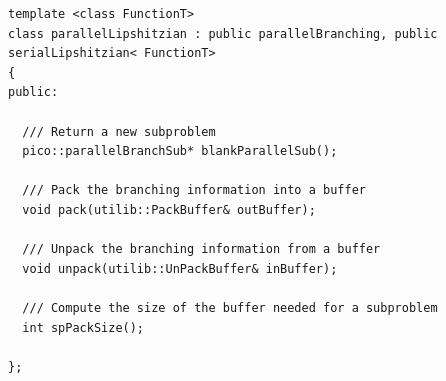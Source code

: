 {\small
\begin{verbatim}
template <class FunctionT>
class parallelLipshitzian : public parallelBranching, public serialLipshitzian< FunctionT>
{
public:

  /// Return a new subproblem
  pico::parallelBranchSub* blankParallelSub();

  /// Pack the branching information into a buffer
  void pack(utilib::PackBuffer& outBuffer);

  /// Unpack the branching information from a buffer
  void unpack(utilib::UnPackBuffer& inBuffer);

  /// Compute the size of the buffer needed for a subproblem
  int spPackSize();

};
\end{verbatim}
}
